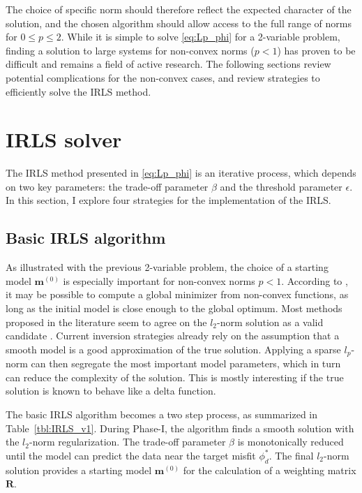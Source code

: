 The choice of specific norm should therefore reflect the expected character of the solution, and the chosen algorithm should allow access to the full range of norms for $0\leq p \leq 2$.
While it is simple to solve \eqref{eq:Lp_phi} for a 2-variable problem, finding a solution to large systems for non-convex norms ($p < 1$) has proven to be difficult and remains a field of active research. 
The following sections review potential complications for the non-convex cases, and review strategies to efficiently solve the IRLS method.

\section{IRLS solver}\label{Solve_IRLS}
The IRLS method presented in \ref{eq:Lp_phi} is an iterative process, which depends on two key parameters: the trade-off parameter $\beta$ and the threshold parameter $\epsilon$.
In this section, I explore four strategies for the implementation of the IRLS.

\subsection{Basic IRLS algorithm}
As illustrated with the previous 2-variable problem, the choice of a starting model $\mathbf{m}^{(0)}$ is especially important for non-convex norms $p < 1$.
According to \cite{Chartrand07}, it may be possible to compute a global minimizer from non-convex functions, as long as the initial model is close enough to the global optimum.
Most methods proposed in the literature seem to agree on the $l_2$-norm solution as a valid candidate \cite[]{ PortniaguineZhdanov02, Ajo-Franklin07, SunLi14}.
Current inversion strategies already rely on the assumption that a smooth model is a good approximation of the true solution.
Applying a sparse $l_p$-norm can then segregate the most important model parameters, which in turn can reduce the complexity of the solution. 
This is mostly interesting if the true solution is known to behave like a delta function. 

The basic IRLS algorithm becomes a two step process, as summarized in Table~\ref{tbl:IRLS_v1}.
During Phase-I, the algorithm finds a smooth solution with the $l_2$-norm regularization.
The trade-off parameter $\beta$ is monotonically reduced until the model can predict the data near the target misfit $\phi_d^*$.
The final $l_2$-norm solution provides a starting model $\mathbf{m}^{(0)}$ for the calculation of a weighting matrix $\mathbf{R}$.

